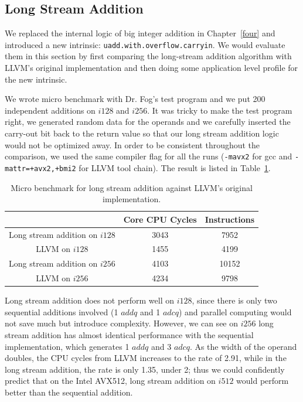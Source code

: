 \subsection{Long Stream Addition}
We replaced the internal logic of big integer addition in Chapter~\ref{four} and introduced a new intrinsic: {\tt uadd.with.overflow.carryin}. We would evaluate them in this section by first comparing the long-stream addition algorithm with LLVM's original implementation and then doing some application level profile for the new intrinsic.

We wrote micro benchmark with Dr. Fog's test program and we put 200 independent additions on $i128$ and $i256$. It was tricky to make the test program right, we generated random data for the operands and we carefully inserted the carry-out bit back to the return value so that our long stream addition logic would not be optimized away. In order to be consistent throughout the comparison, we used the same compiler flag for all the runs ({\tt -mavx2} for gcc and {\tt -mattr=+avx2,+bmi2} for LLVM tool chain). The result is listed in Table~\ref{table:lsadd_micro}.

\begin{table}[h]
\centering
\begin{tabular}{|c|c|c|}
\hline
                             & Core CPU Cycles & Instructions \\ \hline
Long stream addition on $i128$ & 3043            & 7952         \\ \hline
LLVM on $i128$                 & 1455            & 4199         \\ \hline
Long stream addition on $i256$ & 4103            & 10152        \\ \hline
LLVM on $i256$                 & 4234            & 9798         \\ \hline
\end{tabular}
\caption{Micro benchmark for long stream addition against LLVM's original implementation.}
\label{table:lsadd_micro}
\end{table}

Long stream addition does not perform well on $i128$, since there is only two sequential additions involved (1 $addq$ and 1 $adcq$) and parallel computing would not save much but introduce complexity. However, we can see on $i256$ long stream addition has almost identical performance with the sequential implementation, which generates 1 $addq$ and 3 $adcq$. As the width of the operand doubles, the CPU cycles from LLVM increases to the rate of 2.91, while in the long stream addition, the rate is only 1.35, under 2; thus we could confidently predict that on the Intel AVX512, long stream addition on $i512$ would perform better than the sequential addition.

